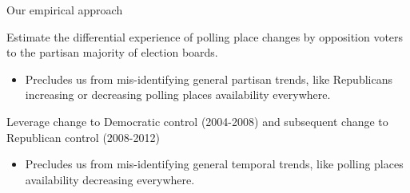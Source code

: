 \documentclass[xcolor=dvipsnames, 11pt, table]{beamer}
\begin{document}
\begin{frame}{Our empirical approach}

	\pause
	Estimate the \alert{differential} experience of polling place changes by \alert{opposition voters} to the partisan majority of election boards. \\
	\pause 
	\begin{itemize}
		\item Precludes us from mis-identifying general partisan trends, like Republicans increasing or decreasing polling places availability everywhere.
	\end{itemize}

	\pause
	Leverage \alert{change} to Democratic control (2004-2008) and subsequent \alert{change} to Republican control (2008-2012)
	\pause 
	\begin{itemize}
		\item Precludes us from mis-identifying general temporal trends, like polling places availability decreasing everywhere.
	\end{itemize}
\end{frame}





\end{document}
